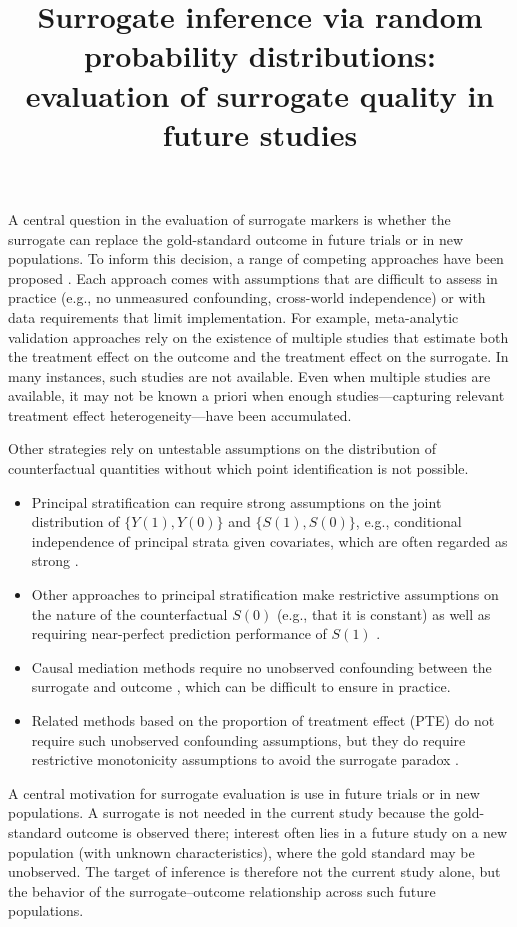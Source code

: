 \documentclass{article}
\title{Surrogate inference via random probability distributions: evaluation of surrogate quality in future studies}
\begin{document}
\maketitle

A central question in the evaluation of surrogate markers is whether the surrogate can replace the gold-standard outcome in future trials or in new populations. To inform this decision, a range of competing approaches have been proposed \cite{joffe2009related}. Each approach comes with assumptions that are difficult to assess in practice (e.g., no unmeasured confounding, cross-world independence) or with data requirements that limit implementation. For example, meta-analytic validation approaches \cite{buyse2000validation} rely on the existence of multiple studies that estimate both the treatment effect on the outcome and the treatment effect on the surrogate. In many instances, such studies are not available. Even when multiple studies are available, it may not be known a priori when enough studies---capturing relevant treatment effect heterogeneity---have been accumulated. 

Other strategies rely on untestable assumptions on the distribution of counterfactual quantities without which point identification is not possible. 
\begin{itemize}
    \item Principal stratification can require strong assumptions on the joint distribution of $\{Y(1), Y(0)\}$ and $\{S(1), S(0)\}$, e.g., conditional independence of principal strata given covariates, which are often regarded as strong \cite{frangakis2002principal, kim2024bayesian}.
    \item Other approaches to principal stratification make restrictive assumptions on the nature of the counterfactual $S(0)$ (e.g., that it is constant) as well as requiring near-perfect prediction performance of $S(1)$ \cite{elliott2023surrogate}. 
    \item Causal mediation methods require no unobserved confounding between the surrogate and outcome \cite{vanderweele2015mediation}, which can be difficult to ensure in practice. 
    \item Related methods based on the proportion of treatment effect (PTE) do not require such unobserved confounding assumptions, but they do require restrictive monotonicity assumptions to avoid the surrogate paradox \cite{chen2003pte}.
\end{itemize}

A central motivation for surrogate evaluation is use in future trials or in new populations. A surrogate is not needed in the current study because the gold-standard outcome is observed there; interest often lies in a future study on a new population (with unknown characteristics), where the gold standard may be unobserved. The target of inference is therefore not the current study alone, but the behavior of the surrogate--outcome relationship across such future populations.
\end{document}
